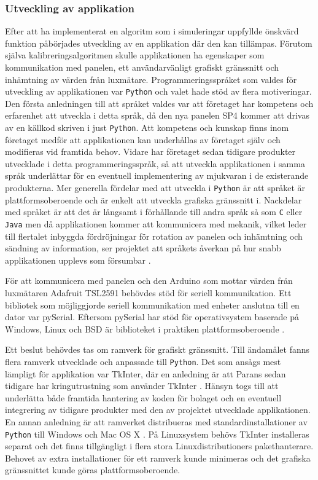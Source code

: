         \subsubsection{Utveckling av applikation} %
        \label{ssub:utveckling_av_applikation}
            Efter att ha implementerat en algoritm som i simuleringar uppfyllde önskvärd funktion påbörjades utveckling av en applikation där den kan tillämpas. Förutom själva kalibreringsalgoritmen skulle applikationen ha egenskaper som kommunikation med panelen, ett användarvänligt grafiskt gränssnitt och inhämtning av värden från luxmätare. Programmeringsspråket som valdes för utveckling av applikationen var \texttt{Python} och valet hade stöd av flera motiveringar. Den första anledningen till att språket valdes var att företaget har kompetens och erfarenhet att utveckla i detta språk, då den nya panelen SP4 kommer att drivas av en källkod skriven i just \texttt{Python}. Att kompetens och kunskap finns inom företaget medför att applikationen kan underhållas av företaget själv och modifieras vid framtida behov. Vidare har företaget sedan tidigare produkter utvecklade i detta programmeringsspråk, så att utveckla applikationen i samma språk underlättar för en eventuell implementering av mjukvaran i de existerande produkterna. Mer generella fördelar med att utveckla i \texttt{Python} är att språket är plattformsoberoende och är enkelt att utveckla grafiska gränssnitt i. Nackdelar med språket är att det är långsamt i förhållande till andra språk så som \texttt{C} eller \texttt{Java} men då applikationen kommer att kommunicera med mekanik, vilket leder till flertalet inbyggda fördröjningar för rotation av panelen och inhämtning och sändning av information, ser projektet att språkets åverkan på hur snabb applikationen upplevs som försumbar \cite{python_speed}. \bigskip

            För att kommunicera med panelen och den Arduino som mottar värden från luxmätaren Adafruit TSL2591 behövdes stöd för seriell kommunikation. Ett bibliotek som möjliggjorde seriell kommunikation med enheter anslutna till en dator var pySerial. Eftersom pySerial har stöd för operativsystem baserade på Windows, Linux och BSD är biblioteket i praktiken plattformsoberoende \cite{pyserial}. \bigskip

            Ett beslut behövdes tas om ramverk för grafiskt gränssnitt. Till ändamålet fanns flera ramverk utvecklade och anpassade till \texttt{Python}. Det som ansågs mest lämpligt för applikation var TkInter, där en anledning är att Parans sedan tidigare har kringutrustning som använder TkInter \cite{solarremote}. Hänsyn togs till att underlätta både framtida hantering av koden för bolaget och en eventuell integrering av tidigare produkter med den av projektet utvecklade applikationen. En annan anledning är att ramverket distribueras med standardinstallationer av \texttt{Python} till Windows och Mac OS X \cite{tkinter}. På Linuxsystem behövs TkInter installeras separat och det finns tillgängligt i flera stora Linuxdistributioners pakethanterare. Behovet av extra installationer för ett ramverk kunde minimeras och det grafiska gränssnittet kunde göras plattformsoberoende. \bigskip

